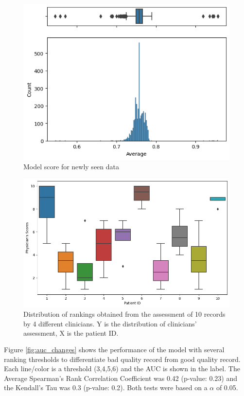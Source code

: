 \begin{figure}[htbp]
\centering
\caption{Model score for newly seen data}\label{fig:scores} 
\includegraphics[scale=0.78]{figures/Scoring_V2.png}
\end{figure}

\begin{figure}[htbp]
\centering
\caption{Distribution of rankings obtained from the assessment of 10 records by 4 different clinicians. Y is the distribution of clinicians' assessment, X is the patient ID.}\label{fig:clinical-dq} 
\includegraphics[scale=0.52]{figures/clinical_assessment_no_model.png}
\end{figure}

Figure \ref{fig:auc_changes} shows the performance of the model with several ranking thresholds to differentiate bad quality record from good quality record. Each line/color is a threshold (3,4,5,6) and the AUC is shown in the label. The Average Spearman's Rank Correlation Coefficient was 0.42 (p-value: 0.23) and the Kendall's Tau was 0.3 (p-value: 0.2). Both tests were based on a $\alpha$ of 0.05.

